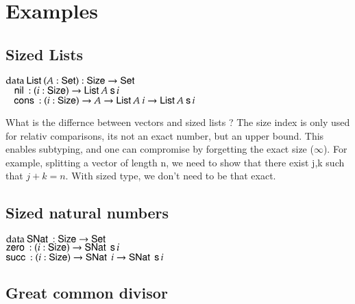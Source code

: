 \section{Examples}
\subsection{Sized Lists}
\begin{bsp}
$\mathrm{data}\: \mathsf{List}\: ( A : \mathsf{Set} ) : \mathsf{Size} \rightarrow \mathsf{Set} $ \\
$\hspace*{3mm} \mathsf{nil}\: : ( i : \mathsf{Size} ) \rightarrow{ \mathsf{List}\:A \: \mathsf{s}\,i} $\\
$\hspace*{3mm} \mathsf{cons}\: : ( i : \mathsf{Size} ) \rightarrow{ A \rightarrow\mathsf{List}\:A \: i \rightarrow\mathsf{List}\:A \: \mathsf{s}\,i} $
\end{bsp}

What is the differnce between vectors and sized lists ?
The size index is only used for relativ comparisons, its not an exact number, but an upper bound.
This enables subtyping, and one can compromise by forgetting the exact size ($\infty$).
For example, splitting a vector of length n, we need to show that there exist j,k such that $j+k = n$.
With sized type, we don't need to be that exact.
\subsection{Sized natural numbers}
\begin{bsp}
$\mathrm{data}\: \mathsf{SNat}\: : \mathsf{Size} \rightarrow \mathsf{Set} $ \\
$\mathsf{zero}\: : ( i : \mathsf{Size} ) \rightarrow{ \mathsf{SNat}\:\: \mathsf{s}\,i} $\\
$\mathsf{succ}\: : ( i : \mathsf{Size} ) \rightarrow{ \mathsf{SNat}\:\: i \rightarrow\mathsf{SNat}\:\: \mathsf{s}\,i} $
\end{bsp}

\subsection{Great common divisor}

